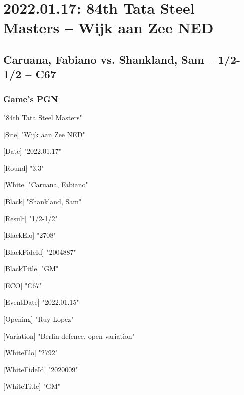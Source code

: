 \documentclass[9pt]{extarticle}
\begin{document}
\setlength{\columnsep}{32pt}
\section*{2022.01.17: 84th Tata Steel Masters -- Wijk aan Zee NED}

\subsection*{Caruana, Fabiano vs. Shankland, Sam -- 1/2-1/2 -- C67}
\subsubsection*{Game's PGN}
\begin{multicols}{2}
\begin{flushleft}
[Event] "84th Tata Steel Masters"

[Site] "Wijk aan Zee NED"

[Date] "2022.01.17"

[Round] "3.3"

[White] "Caruana, Fabiano"

[Black] "Shankland, Sam"

[Result] "1/2-1/2"

[BlackElo] "2708"

[BlackFideId] "2004887"

[BlackTitle] "GM"

[ECO] "C67"

[EventDate] "2022.01.15"

[Opening] "Ruy Lopez"

[Variation] "Berlin defence, open variation"

[WhiteElo] "2792"

[WhiteFideId] "2020009"

[WhiteTitle] "GM"


\end{flushleft}
\end{multicols}
\end{document}
